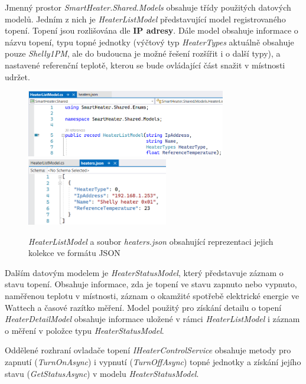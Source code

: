 Jmenný prostor {\it SmartHeater.Shared.Models} obsahuje třídy použitých datových modelů. Jedním z nich je {\it HeaterListModel} představující model registrovaného topení. Topení jsou rozlišována dle \textbf{IP adresy}. Dále model obsahuje informace o názvu topení, typu topné jednotky (výčtový typ {\it HeaterTypes} aktuálně obsahuje pouze {\it Shelly1PM}, ale do budoucna je možné řešení rozšířit i o další typy), a nastavené referenční teplotě, kterou se bude ovládající část snažit v místnosti udržet.

\pagebreak

\begin{figure}[hbt]
\centering
\includegraphics[height=2.94cm]{obrazky-figures/code-heaterslistmodel.png}
\includegraphics[height=2.94cm]{obrazky-figures/code-heatersjson.png}
\caption{{\it HeaterListModel} a soubor {\it heaters.json} obsahující reprezentaci jejich kolekce ve formátu JSON}
\end{figure}

Dalším datovým modelem je {\it HeaterStatusModel}, který představuje záznam o stavu topení. Obsahuje informace, zda je topení ve stavu zapnuto nebo vypnuto, naměřenou teplotu v místnosti, záznam o okamžité spotřebě elektrické energie ve Wattech a časové razítko měření. Model použitý pro získání detailu o topení {\it HeaterDetailModel} obsahuje informace uložené v rámci {\it HeaterListModel} i záznam o měření v položce typu {\it HeaterStatusModel}.

Oddělené rozhraní ovladače topení {\it IHeaterControlService} obsahuje metody pro zapnutí ({\it TurnOnAsync}) i vypnutí ({\it TurnOffAsync}) topné jednotky a získání jejího stavu ({\it GetStatusAsync}) v modelu {\it HeaterStatusModel}.

